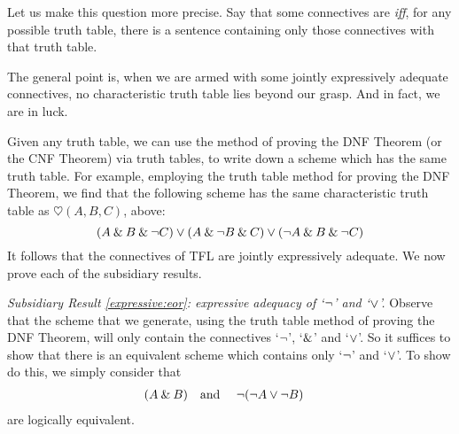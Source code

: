 Let us make this question more precise. Say that some connectives are  \emph{iff}, for any possible truth table, there is a sentence containing only those connectives with that truth table.


The general point is, when we are armed with some jointly expressively adequate connectives, no characteristic truth table lies beyond our grasp. And in fact, we are in luck.

Given any truth table, we can use the method of proving the DNF Theorem (or the CNF Theorem) via truth tables, to write down a scheme which has the same truth table. For example, employing the truth table method for proving the DNF Theorem, we find that the following scheme has the same characteristic truth table as $\heartsuit(A,B,C)$, above:
		$$(A \mathbin{\&} B \mathbin{\&} \neg C) \vee (A \mathbin{\&} \neg B \mathbin{\&} C) \vee (\neg A \mathbin{\&} B \mathbin{\&} \neg C)$$
It follows that the connectives of TFL are jointly expressively adequate. We now prove each of the subsidiary results.

\emph{Subsidiary Result \ref{expressive:eor}: expressive adequacy of `$\neg$' and `$\vee$'.} Observe that the scheme that we generate, using the truth table method of proving the DNF Theorem, will only contain the connectives `$\neg$', `$\mathbin{\&}$' and `$\vee$'. So it suffices to show that there is an equivalent scheme which contains only `$\neg$' and `$\vee$'. To show do this, we simply consider that
		\begin{align*}
		(A \mathbin{\&} B) & \text{\quad and \quad} \neg(\neg A \vee\neg B)
		\end{align*}
		are logically equivalent.


